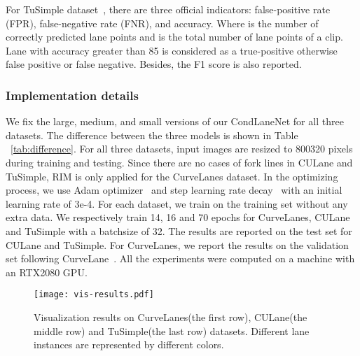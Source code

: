 \documentclass[10pt,twocolumn,letterpaper]{article}
\begin{document}
For TuSimple dataset~\cite{c.elmohamed}, there are three official indicators: false-positive rate (FPR), false-negative rate (FNR), and accuracy.
Where  is the number of correctly predicted lane points and  is the total number of lane points of a clip. 
Lane with accuracy greater than 85 is considered as a true-positive otherwise false positive or false negative. Besides, the F1 score is also reported.

\subsubsection{Implementation details}

We fix the large, medium, and small versions of our CondLaneNet for all three datasets. The difference between the three models is shown in Table ~\ref{tab:difference}.
For all three datasets, input images are resized to 800320 pixels during training and testing. Since there are no cases of fork lines in CULane and TuSimple, RIM is only applied for the CurveLanes dataset. In the optimizing process, we use Adam optimizer~\cite{kingma2014adam} and step learning rate decay~\cite{loshchilov2017decoupled} with an initial learning rate of 3e-4. For each dataset, we train on the training set without any extra data. We respectively train 14, 16 and 70 epochs for CurveLanes, CULane and TuSimple with a batchsize of 32.
The results are reported on the test set for CULane and TuSimple. For CurveLanes, we report the results on the validation set following CurveLane~\cite{li2020curvelane}. All the experiments were computed on a machine with an RTX2080 GPU.
\begin{table}[!h]
\centering
{}
\caption{Difference of different versions of our CondLaneNet.}
\label{tab:difference}
\end{table}

{\begin{figure*}[ht]
\centering
\texttt{[image: vis-results.pdf]}
\caption{Visualization results on CurveLanes(the first row), CULane(the middle row) and TuSimple(the last row) datasets. Different lane instances are represented by different colors.
}
\label{Fig.vis} \end{figure*}}
\end{document}
